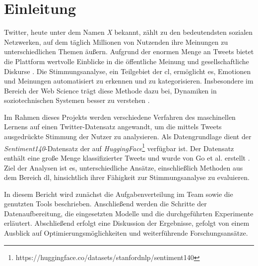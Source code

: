 \section{Einleitung}

Twitter, heute unter dem Namen \textit{X} bekannt, zählt zu den bedeutendsten sozialen Netzwerken, auf dem täglich Millionen von Nutzenden ihre Meinungen zu unterschiedlichen Themen äußern.
Aufgrund der enormen Menge an Tweets bietet die Plattform wertvolle Einblicke in die öffentliche Meinung und gesellschaftliche Diskurse \cite{pak2010twitter}.
Die Stimmungsanalyse, ein Teilgebiet der \gls{cl}, ermöglicht es, Emotionen und Meinungen automatisiert zu erkennen und zu kategorisieren.
Insbesondere im Bereich der Web Science trägt diese Methode dazu bei, Dynamiken in soziotechnischen Systemen besser zu verstehen \cite{berners2006web, liu2012sentiment}.

Im Rahmen dieses Projekts werden verschiedene Verfahren des maschinellen Lernens auf einen Twitter-Datensatz angewandt, um die mittels Tweets ausgedrückte Stimmung der Nutzer zu analysieren.
Als Datengrundlage dient der \textit{Sentiment140}-Datensatz der auf \textit{HuggingFace}\footnote{https://huggingface.co/datasets/stanfordnlp/sentiment140} verfügbar ist.
Der Datensatz enthält eine große Menge klassifizierter Tweets und wurde von Go et al. erstellt \cite{go2009twitter}.
Ziel der Analysen ist es, unterschiedliche Ansätze, einschließlich Methoden aus dem Bereich \gls{dl}, hinsichtlich ihrer Fähigkeit zur Stimmungsanalyse zu evaluieren.

In diesem Bericht wird zunächst die Aufgabenverteilung im Team sowie die genutzten Tools beschrieben.
Anschließend werden die Schritte der Datenaufbereitung, die eingesetzten Modelle und die durchgeführten Experimente erläutert.
Abschließend erfolgt eine Diskussion der Ergebnisse, gefolgt von einem Ausblick auf Optimierungsmöglichkeiten und weiterführende Forschungsansätze.
